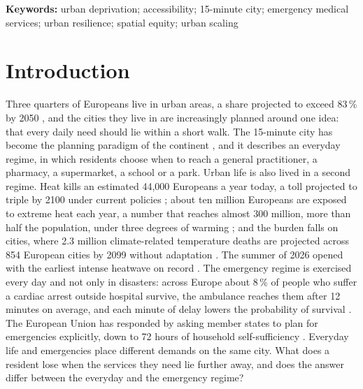 \documentclass[11pt]{article}
\begin{document}
\bigskip
\noindent\textbf{Keywords:} urban deprivation; accessibility; 15-minute
city; emergency medical services; urban resilience; spatial equity; urban
scaling

\clearpage

\section{Introduction}\label{sec:intro}

Three quarters of Europeans live in urban areas, a share projected to
exceed 83\,\% by 2050 \citep{eea2024urbanadaptation}, and the cities they
live in are increasingly planned around one idea: that every daily need
should lie within a short walk. The 15-minute city has become the planning
paradigm of the continent \citep{moreno2021fifteenminute,allam2022fifteenminute},
and it describes an everyday regime, in which residents choose when to
reach a general practitioner, a pharmacy, a supermarket, a school or a
park. Urban life is also lived in a second regime. Heat kills an estimated
44,000 Europeans a year today, a toll projected to triple by 2100 under
current policies \citep{garcialeon2024mortality}; about ten million
Europeans are exposed to extreme heat each year, a number that reaches
almost 300 million, more than half the population, under three degrees of
warming \citep{naumann2020heat}; and the burden falls on cities, where
2.3 million climate-related temperature deaths are projected across 854
European cities by 2099 without adaptation \citep{masselot2025cities}. The
summer of 2026 opened with the earliest intense heatwave on record
\citep{copernicus2026mayheat}. The emergency regime is exercised every
day and not only in disasters: across Europe about 8\,\% of people who
suffer a cardiac arrest outside hospital survive, the ambulance reaches
them after 12 minutes on average, and each minute of delay lowers the
probability of survival \citep{grasner2020eureca,grasner2025eureca3,larsen1993survival}.
The European Union has responded by asking member states to plan for
emergencies explicitly, down to 72 hours of household self-sufficiency
\citep{ec2025preparedness}. Everyday life and emergencies place different
demands on the same city. What does a resident lose when the services they
need lie further away, and does the answer differ between the everyday
and the emergency regime?
\end{document}
